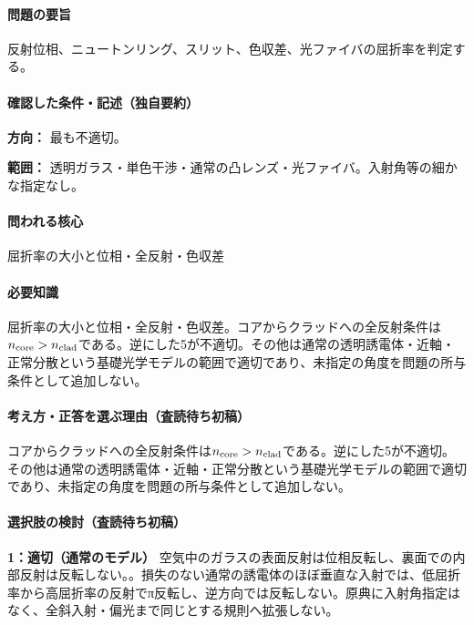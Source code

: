 \paragraph{問題の要旨} 反射位相、ニュートンリング、スリット、色収差、光ファイバの屈折率を判定する。

\paragraph{確認した条件・記述（独自要約）}\mbox{}\par

\noindent\textbf{方向：} 最も不適切。\par

\noindent\textbf{範囲：} 透明ガラス・単色干渉・通常の凸レンズ・光ファイバ。入射角等の細かな指定なし。\par

\paragraph{問われる核心} 屈折率の大小と位相・全反射・色収差

\paragraph{必要知識} 屈折率の大小と位相・全反射・色収差。コアからクラッドへの全反射条件は\(n_{\rm core}>n_{\rm clad}\)である。逆にした5が不適切。その他は通常の透明誘電体・近軸・正常分散という基礎光学モデルの範囲で適切であり、未指定の角度を問題の所与条件として追加しない。

\paragraph{考え方・正答を選ぶ理由（査読待ち初稿）} コアからクラッドへの全反射条件は\(n_{\rm core}>n_{\rm clad}\)である。逆にした5が不適切。その他は通常の透明誘電体・近軸・正常分散という基礎光学モデルの範囲で適切であり、未指定の角度を問題の所与条件として追加しない。

\paragraph{選択肢の検討（査読待ち初稿）}\mbox{}\par

\noindent\textbf{1：適切（通常のモデル）} 空気中のガラスの表面反射は位相反転し、裏面での内部反射は反転しない。。損失のない通常の誘電体のほぼ垂直な入射では、低屈折率から高屈折率の反射でπ反転し、逆方向では反転しない。原典に入射角指定はなく、全斜入射・偏光まで同じとする規則へ拡張しない。\par

